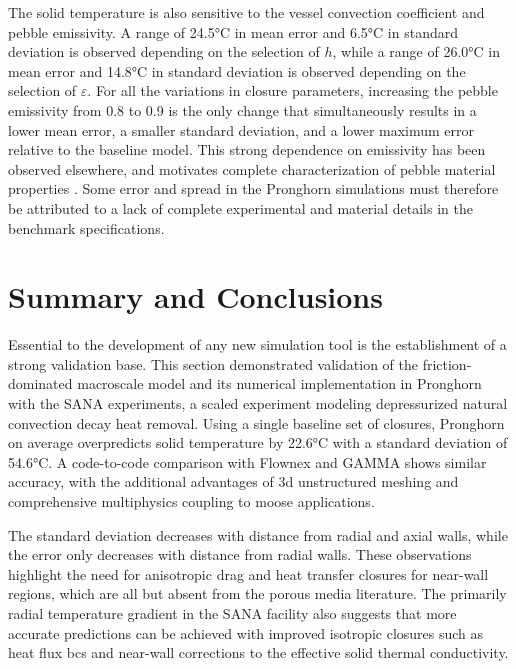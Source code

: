 The solid temperature is also sensitive to the vessel convection coefficient and pebble emissivity. A range of 24.5\si{\celsius} in mean error and 6.5\si{\celsius} in standard deviation is observed depending on the selection of \(h\), while a range of 26.0\si{\celsius} in mean error and 14.8\si{\celsius} in standard deviation is observed depending on the selection of \(\varepsilon\). For all the variations in closure parameters, increasing the pebble emissivity from 0.8 to 0.9 is the only change that simultaneously results in a lower mean error, a smaller standard deviation, and a lower maximum error relative to the baseline model. This strong dependence on emissivity has been observed elsewhere, and motivates complete characterization of pebble material properties \cite{tecdoc1163}. Some error and spread in the Pronghorn simulations must therefore be attributed to a lack of complete experimental and material details in the benchmark specifications.

\section{Summary and Conclusions}
\label{sec:5_summary}

Essential to the development of any new simulation tool is the establishment of a strong validation base. This section demonstrated validation of the friction-dominated macroscale model and its numerical implementation in Pronghorn with the SANA experiments, a scaled experiment modeling depressurized natural convection decay heat removal. Using a single baseline set of closures, Pronghorn on average overpredicts solid temperature by 22.6\si{\celsius} with a standard deviation of 54.6\si{\celsius}. A code-to-code comparison with Flownex and GAMMA shows similar accuracy, with the additional advantages of \gls{3d} unstructured meshing and comprehensive multiphysics coupling to \gls{moose} applications. 

The standard deviation decreases with distance from radial and axial walls, while the error only decreases with distance from radial walls. These observations highlight the need for anisotropic drag and heat transfer closures for near-wall regions, which are all but absent from the porous media literature. The primarily radial temperature gradient in the SANA facility also suggests that more accurate predictions can be achieved with improved isotropic closures such as heat flux \glspl{bc} and near-wall corrections to the effective solid thermal conductivity. 

